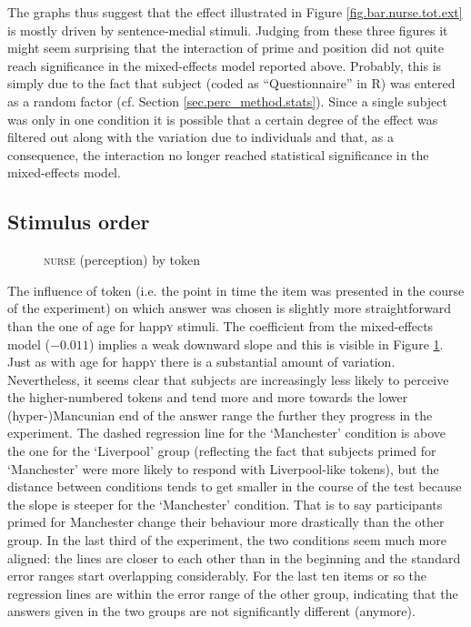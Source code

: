 The graphs thus suggest that the  effect illustrated in Figure \ref{fig.bar.nurse.tot.ext} is mostly driven by sentence-medial stimuli.
Judging from these three figures it might seem surprising that the interaction of prime and position did not quite reach significance in the mixed-effects model reported above.
Probably, this is simply due to the fact that subject (coded as ``Questionnaire'' in R) was entered as a random factor (cf. Section \ref{sec.perc_method.stats}).
Since a single subject was only in one  condition it is possible that a certain degree of the  effect was filtered out along with the variation due to individuals and that, as a consequence, the interaction no longer reached statistical significance in the mixed-effects model.

\subsection{Stimulus order}
\label{sec.perc_res.nurse.order}

\begin{figure}[h]
	\centering
		\resizebox{.49\linewidth}{!}{} 
	\caption{\textsc{nurse} (perception) by token}
	\label{fig.scatter.nurse.ext.token}
\end{figure}

The influence of token (i.e. the point in time the item was presented in the course of the experiment) on which answer was chosen is slightly more straightforward than the one of age for happ\textsc{y} stimuli.
The coefficient from the mixed-effects model (\ensuremath{-0.011}) implies a weak downward slope and this is visible in Figure \ref{fig.scatter.nurse.ext.token}.
Just as with age for happ\textsc{y} there is a substantial amount of variation.
Nevertheless, it seems clear that subjects are increasingly less likely to perceive the higher-numbered tokens and tend more and more towards the lower (hyper-)Mancunian end of the answer range the further they progress in the experiment.
The dashed regression line for the `Manchester'  condition is above the one for the `Liverpool' group (reflecting the fact that subjects primed for `Manchester' were more likely to respond with Liverpool-like tokens), but the distance between conditions tends to get smaller in the course of the test because the slope is steeper for the `Manchester' condition. That is to say participants primed for Manchester change their behaviour more drastically than the other group.
In the last third of the experiment, the two conditions seem much more aligned: the lines are closer to each other than in the beginning and the standard error ranges start overlapping considerably.
For the last ten items or so the regression lines are within the error range of the other group, indicating that the answers given in the two groups are not significantly different (anymore).

